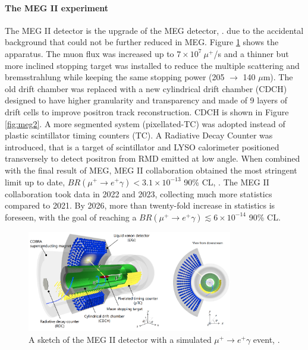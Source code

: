 \paragraph{The MEG II experiment}
The MEG II detector is the upgrade of the MEG detector, \cite{megiicollaboration2024operation}.
due to the accidental background that could not be further reduced in MEG.
Figure \ref{fig:meg22} shows the apparatus. The muon flux was increased up to $7 \times 10^7 \ \mu^+$/s and a thinner but more inclined 
stopping target was installed to reduce the multiple scattering and bremsstrahlung 
while keeping the same stopping power (205 $\rightarrow$ 140 $\mu$m).
The old drift chamber was replaced with a new cylindrical drift chamber (CDCH) designed
to have higher granularity and transparency and made of 9 layers of drift cells to
improve positron track reconstruction. CDCH is shown 
in Figure \ref{fig:meg2}.
A more segmented system (pixellated-TC) was adopted instead of plastic scintillator timing counters (TC).
A Radiative Decay Counter was introduced, that is a target of scintillator and LYSO calorimeter positioned transversely to detect positron from RMD emitted at low angle.
When combined with the final result of MEG, MEG II collaboration obtained the most stringent limit up to date, $BR(\mu^+ \rightarrow e^+ \gamma)<3.1\times 10^{-13}$ 90\% CL, \cite{megiicollaboration2024search}.
The MEG II collaboration took data in 2022 and 2023, collecting much more statistics compared to 2021. By 2026, more than twenty-fold increase in statistics is foreseen, with the goal of reaching a
$BR(\mu^+ \rightarrow e^+ \gamma)\lesssim 6\times 10^{-14}$ 90\% CL.
\begin{figure}[!h]
    \centering
    \includegraphics[width =0.8\textwidth]{figures/png/Screenshot_20240307_140116.png}
    \caption[MEG II detector (I).]{A sketch of the MEG II detector with a simulated $\mu^+ \rightarrow e^+ \gamma $ event, \cite{megiicollaboration2024operation}.}
    \label{fig:meg22}
    \end{figure}
